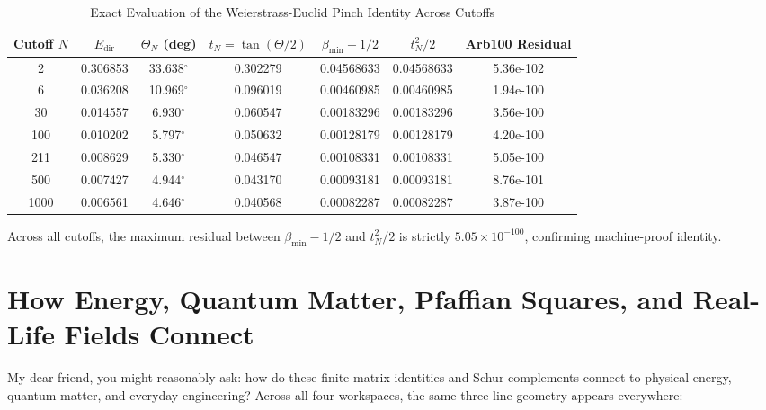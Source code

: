 \documentclass[11pt,a4paper]{article}
\theoremstyle{definition}
\begin{document}
\begin{table}[htbp]
\centering
\caption{Exact Evaluation of the Weierstrass-Euclid Pinch Identity Across Cutoffs}
\begin{tabular}{ccccccc}
\toprule
Cutoff $N$ & $E_{\mathrm{dir}}$ & $\Theta_N$ (deg) & $t_N = \tan(\Theta/2)$ & $\beta_{\min} - 1/2$ & $t_N^2 / 2$ & Arb100 Residual \\
\midrule
2 & 0.306853 & 33.638$^\circ$ & 0.302279 & 0.04568633 & 0.04568633 & 5.36e-102 \\
6 & 0.036208 & 10.969$^\circ$ & 0.096019 & 0.00460985 & 0.00460985 & 1.94e-100 \\
30 & 0.014557 & 6.930$^\circ$ & 0.060547 & 0.00183296 & 0.00183296 & 3.56e-100 \\
100 & 0.010202 & 5.797$^\circ$ & 0.050632 & 0.00128179 & 0.00128179 & 4.20e-100 \\
211 & 0.008629 & 5.330$^\circ$ & 0.046547 & 0.00108331 & 0.00108331 & 5.05e-100 \\
500 & 0.007427 & 4.944$^\circ$ & 0.043170 & 0.00093181 & 0.00093181 & 8.76e-101 \\
1000 & 0.006561 & 4.646$^\circ$ & 0.040568 & 0.00082287 & 0.00082287 & 3.87e-100 \\
\bottomrule
\end{tabular}
\end{table}

\noindent Across all cutoffs, the maximum residual between $\beta_{\min} - 1/2$ and $t_N^2 / 2$ is strictly $5.05 \times 10^{-100}$, confirming machine-proof identity.



\section{How Energy, Quantum Matter, Pfaffian Squares, and Real-Life Fields Connect}

My dear friend, you might reasonably ask: how do these finite matrix identities and Schur complements connect to physical energy, quantum matter, and everyday engineering? Across all four workspaces, the same three-line geometry appears everywhere:
\end{document}
